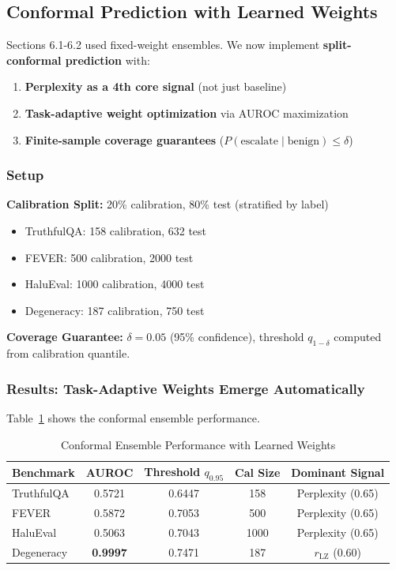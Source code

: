 \documentclass[11pt]{article}
\begin{document}
\subsection{Conformal Prediction with Learned Weights}
\label{sec:eval-conformal}

Sections 6.1-6.2 used fixed-weight ensembles. We now implement \textbf{split-conformal prediction} with:
\begin{enumerate}
\item \textbf{Perplexity as a 4th core signal} (not just baseline)
\item \textbf{Task-adaptive weight optimization} via AUROC maximization
\item \textbf{Finite-sample coverage guarantees} ($P(\text{escalate} \mid \text{benign}) \le \delta$)
\end{enumerate}

\subsubsection{Setup}

\textbf{Calibration Split:} 20\% calibration, 80\% test (stratified by label)
\begin{itemize}
\item TruthfulQA: 158 calibration, 632 test
\item FEVER: 500 calibration, 2000 test
\item HaluEval: 1000 calibration, 4000 test
\item Degeneracy: 187 calibration, 750 test
\end{itemize}

\textbf{Coverage Guarantee:} $\delta = 0.05$ (95\% confidence), threshold $q_{1-\delta}$ computed from calibration quantile.

\subsubsection{Results: Task-Adaptive Weights Emerge Automatically}

Table~\ref{tab:conformal-results} shows the conformal ensemble performance.

\begin{table}[h]
\centering
\caption{Conformal Ensemble Performance with Learned Weights}
\label{tab:conformal-results}
\begin{tabular}{lcccc}
\toprule
\textbf{Benchmark} & \textbf{AUROC} & \textbf{Threshold} $q_{0.95}$ & \textbf{Cal Size} & \textbf{Dominant Signal} \\
\midrule
TruthfulQA  & 0.5721 & 0.6447 & 158  & Perplexity (0.65) \\
FEVER       & 0.5872 & 0.7053 & 500  & Perplexity (0.65) \\
HaluEval    & 0.5063 & 0.7043 & 1000 & Perplexity (0.65) \\
Degeneracy  & \textbf{0.9997} & 0.7471 & 187  & $r_{\text{LZ}}$ (0.60) \\
\bottomrule
\end{tabular}
\end{table}
\end{document}
